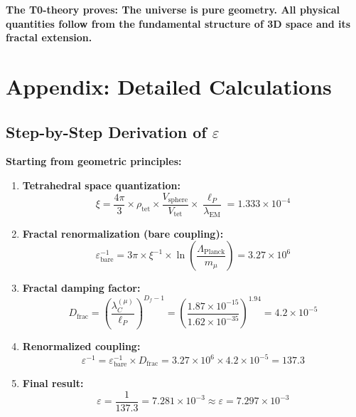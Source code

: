 \documentclass[12pt,a4paper]{article}
\numberwithin{equation}{section}
\newcommand{\xipar}{\xi}
\newcommand{\epsilonT}{\varepsilon}
\newcommand{\Df}{D_f}
\newcommand{\lP}{\ell_P}
\newcommand{\lambdaC}{\lambda_C}
\newcommand{\lambdaEM}{\lambda_{\text{EM}}}
\begin{document}
	\textbf{The T0-theory proves: The universe is pure geometry. All physical quantities follow from the fundamental structure of 3D space and its fractal extension.}
	
	
	\section{Appendix: Detailed Calculations}
	
	\subsection{Step-by-Step Derivation of $\epsilonT$}
	
	\textbf{Starting from geometric principles:}
	
	\begin{enumerate}
		\item \textbf{Tetrahedral space quantization:}
		\begin{equation}
			\xipar = \frac{4\pi}{3} \times \rho_{\text{tet}} \times \frac{V_{\text{sphere}}}{V_{\text{tet}}} \times \frac{\lP}{\lambdaEM} = 1.333 \times 10^{-4}
			\label{eq:xi_step1}
		\end{equation}
		
		\item \textbf{Fractal renormalization (bare coupling):}
		\begin{equation}
			\epsilonT^{-1}_{\text{bare}} = 3\pi \times \xipar^{-1} \times \ln\left(\frac{\Lambda_{\text{Planck}}}{m_\mu}\right) = 3.27 \times 10^6
			\label{eq:epsilon_step2}
		\end{equation}
		
		\item \textbf{Fractal damping factor:}
		\begin{equation}
			D_{\text{frac}} = \left(\frac{\lambdaC^{(\mu)}}{\lP}\right)^{\Df-1} = \left(\frac{1.87 \times 10^{-15}}{1.62 \times 10^{-35}}\right)^{1.94} = 4.2 \times 10^{-5}
			\label{eq:epsilon_step3}
		\end{equation}
		
		\item \textbf{Renormalized coupling:}
		\begin{equation}
			\epsilonT^{-1} = \epsilonT^{-1}_{\text{bare}} \times D_{\text{frac}} = 3.27 \times 10^6 \times 4.2 \times 10^{-5} = 137.3
			\label{eq:epsilon_step4}
		\end{equation}
		
		\item \textbf{Final result:}
		\begin{equation}
			\epsilonT = \frac{1}{137.3} = 7.281 \times 10^{-3} \approx  \epsilonT = 7.297 \times 10^{-3}
			\label{eq:epsilon_step5}
		\end{equation}
	\end{enumerate}
	
\end{document}
